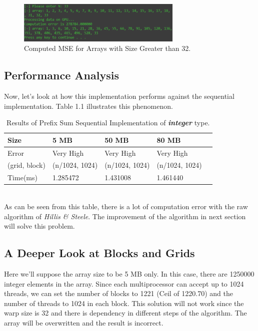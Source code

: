 \documentclass[12pt]{article}
\numberwithin{equation}{section}
\numberwithin{table}{section}
\numberwithin{figure}{section}
\begin{document}
\begin{figure}[!h]\centering
	\includegraphics[width=0.7\textwidth]{1_3.png}
	\caption{Computed MSE for Arrays with Size Greater than 32.}
	\label{pl1}
\end{figure}
\newpage
\subsection{Performance Analysis}
Now, let's look at how this implementation performs against the sequential implementation. Table 1.1 illustrates this phenomenon.
\def\arraystretch{1.3}
\begin{table}[!h]
	\centering
	\begin{tabular}{ |p{3cm}||p{3cm}|p{3cm}|p{3cm}|p{2cm}|}

		\hline
		Size & 5 MB & 50 MB & 80 MB &\\
		\hline
		Error   & Very High    & Very High & Very High  & \\
		\hline
		(grid, block)   &  (n/1024, 1024)    &  (n/1024, 1024) &  (n/1024, 1024)&\\
		\hline
		Time(ms)   &   1.285472    &   1.431008 &  1.461440&\\
		\hline
	\end{tabular}
	\caption{Results of Prefix Sum Sequential Implementation of \textit{\textbf{integer}} type.}
	\label{figsolplot}
\end{table}\\
As can be seen from this table, there is a lot of computation error with the raw algorithm of \textit{Hillis \& Steele}. The improvement of the algorithm in next section will solve this problem.

\subsection{A Deeper Look at Blocks and Grids}
Here we'll suppose the array size to be 5 MB only. In this case, there are 1250000 integer elements in the array. Since each multiprocessor can accept up to 1024 threads, we can set the number of blocks to 1221 (Ceil of 1220.70) and the number of threads to 1024 in each block. This solution will not work since the warp size is 32 and there is dependency in different steps of the algorithm. The array will be overwritten and the result is incorrect.
\end{document}
